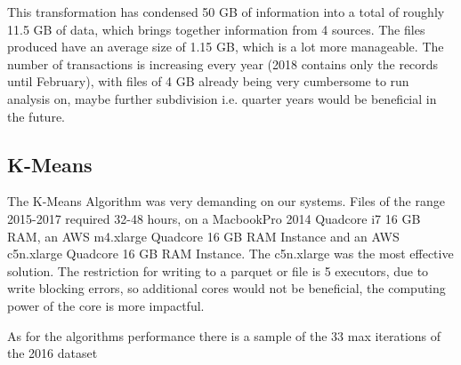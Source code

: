\documentclass{article}
\begin{document}
This transformation has condensed 50 GB of information into a total of roughly 11.5 GB of data,
which brings together information from 4 sources. The files produced have an average size of 1.15 GB, which is
a lot more manageable. The number of transactions is increasing every year (2018 contains only the 
records until February), with files of 4 GB already being very cumbersome to run analysis on, 
maybe further subdivision i.e. quarter years would be beneficial in the future.

\pagebreak
\subsection{K-Means}

The K-Means Algorithm was very demanding on our systems. Files of the range 2015-2017 required 32-48 hours,
on a MacbookPro 2014 Quadcore i7 16 GB RAM, an AWS m4.xlarge Quadcore 16 GB RAM Instance and
an AWS c5n.xlarge Quadcore 16 GB RAM Instance. The c5n.xlarge was the most effective solution.
The restriction for writing to a parquet or file is 5 executors, due to write blocking errors,
so additional cores would not be beneficial, the computing power of the core is more impactful.

\bigskip

As for the algorithms performance there is a sample of the 33 max iterations of the 2016 dataset

\bigskip
\end{document}
